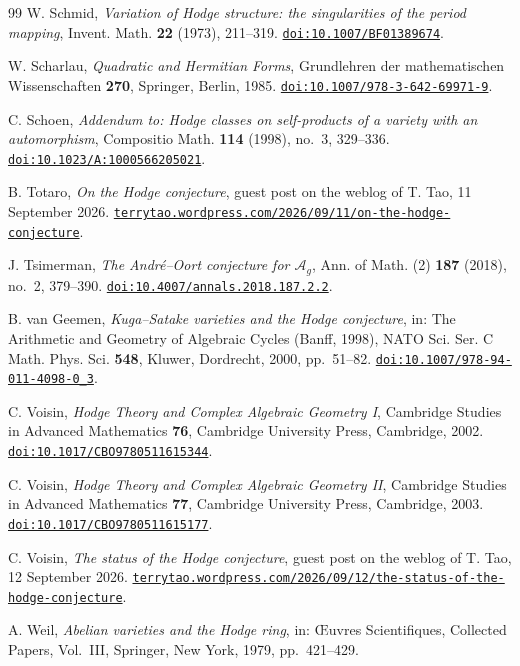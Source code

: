 \documentclass[11pt,reqno]{amsart}
\theoremstyle{plain}
\theoremstyle{definition}
\theoremstyle{remark}
\begin{document}
\begin{thebibliography}{99}
W. Schmid,
\emph{Variation of Hodge structure: the singularities of the period mapping},
Invent. Math. \textbf{22} (1973), 211--319.
\href{https://doi.org/10.1007/BF01389674}{\texttt{doi:10.1007/BF01389674}}.

W. Scharlau,
\emph{Quadratic and Hermitian Forms},
Grundlehren der mathematischen Wissenschaften \textbf{270},
Springer, Berlin, 1985.
\href{https://doi.org/10.1007/978-3-642-69971-9}{\texttt{doi:10.1007/978-3-642-69971-9}}.

C. Schoen,
\emph{Addendum to: Hodge classes on self-products of a variety with an
automorphism},
Compositio Math. \textbf{114} (1998), no.~3, 329--336.
\href{https://doi.org/10.1023/A:1000566205021}{\texttt{doi:10.1023/A:1000566205021}}.

B. Totaro,
\emph{On the Hodge conjecture},
guest post on the weblog of T. Tao, 11 September 2026.
\href{https://terrytao.wordpress.com/2026/09/11/on-the-hodge-conjecture/}%
{\texttt{terrytao.wordpress.com/2026/09/11/on-the-hodge-conjecture}}.

J. Tsimerman,
\emph{The Andr\'e--Oort conjecture for $\mathcal{A}_{g}$},
Ann. of Math. (2) \textbf{187} (2018), no.~2, 379--390.
\href{https://doi.org/10.4007/annals.2018.187.2.2}{\texttt{doi:10.4007/annals.2018.187.2.2}}.

B. van Geemen,
\emph{Kuga--Satake varieties and the Hodge conjecture},
in: The Arithmetic and Geometry of Algebraic Cycles (Banff, 1998),
NATO Sci. Ser. C Math. Phys. Sci. \textbf{548},
Kluwer, Dordrecht, 2000, pp.~51--82.
\href{https://doi.org/10.1007/978-94-011-4098-0_3}{\texttt{doi:10.1007/978-94-011-4098-0\_3}}.

C. Voisin,
\emph{Hodge Theory and Complex Algebraic Geometry I},
Cambridge Studies in Advanced Mathematics \textbf{76},
Cambridge University Press, Cambridge, 2002.
\href{https://doi.org/10.1017/CBO9780511615344}{\texttt{doi:10.1017/CBO9780511615344}}.

C. Voisin,
\emph{Hodge Theory and Complex Algebraic Geometry II},
Cambridge Studies in Advanced Mathematics \textbf{77},
Cambridge University Press, Cambridge, 2003.
\href{https://doi.org/10.1017/CBO9780511615177}{\texttt{doi:10.1017/CBO9780511615177}}.

C. Voisin,
\emph{The status of the Hodge conjecture},
guest post on the weblog of T. Tao, 12 September 2026.
\href{https://terrytao.wordpress.com/2026/09/12/the-status-of-the-hodge-conjecture/}%
{\texttt{terrytao.wordpress.com/2026/09/12/the-status-of-the-hodge-conjecture}}.

A. Weil,
\emph{Abelian varieties and the Hodge ring},
in: \OE uvres Scientifiques, Collected Papers, Vol.~III,
Springer, New York, 1979, pp.~421--429.

\end{thebibliography}
\end{document}
